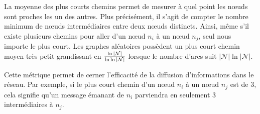 La moyenne des plus courts chemins permet de mesurer à quel point les nœuds sont
proches les un des autres. Plus précisément, il s'agit de compter le nombre
minimum de nœuds intermédiaires entre deux nœuds distincts. Ainsi, même s'il
existe plusieurs chemins pour aller d'un nœud $n_i$ à un nœud $n_j$, seul nous
importe le plus court.  Les graphes aléatoires possèdent un plus court chemin
moyen très petit grandissant en $\ln|\mathcal{N}|\over\ln\ln|\mathcal{N}|$
lorsque le nombre d'arcs suit $|\mathcal{N}|\ln|\mathcal{N}|$.

Cette métrique permet de cerner l'efficacité de la diffusion d'informations dans
le réseau. Par exemple, si le plus court chemin d'un nœud $n_i$ à un nœud $n_j$
est de 3, cela signifie qu'un message émanant de $n_i$ parviendra en seulement 3
intermédiaires à $n_j$.

